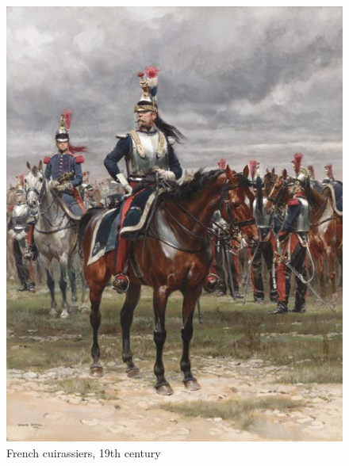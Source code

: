 \documentclass{article}
\begin{document}
\begin{center}
\begin{figure}[H]
\begin{minipage}[H]{0.45\linewidth}
	\includegraphics[width=\linewidth]{../ressources/cuirassiers}
	\caption{French cuirassiers, 19th century \cite{heavy_cavalry}}
\end{minipage}
\hfill
\end{figure}
\end{center}
\end{document}
